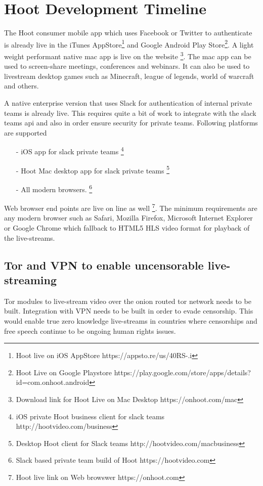 \documentclass{article}
\begin{document}
\section{Hoot Development Timeline}
The Hoot consumer mobile app which uses Facebook or Twitter to authenticate is already live in the iTunes AppStore\footnote{Hoot live on iOS AppStore https://appsto.re/us/40RS-.i} and Google Android Play Store\footnote{Hoot Live on Google Playstore https://play.google.com/store/apps/details?id=com.onhoot.android}.
A light weight performant native  mac app is live on
the website \footnote{Download link for Hoot Live on Mac Desktop https://onhoot.com/mac}. The mac app can be used to screen-share meetings, conferences and webinars. It can also be used
to livestream desktop games such as Minecraft, league of legends,
world of warcraft and others.

A native enterprise version that uses Slack for authentication of
internal private teams is already live.
 This requires quite a bit of work to integrate with the slack teams api and also in order  ensure security for private teams. Following platforms are supported
\begin{itemize}

\item[-]iOS app for slack private teams \footnote{ iOS private Hoot business client for slack teams http://hootvideo.com/business}
\item[-]Hoot Mac desktop app for slack private teams \footnote{Desktop Hoot client for Slack teams http://hootvideo.com/macbusiness}
\item[-]All modern browsers. \footnote{Slack based private team build of Hoot https://hootvideo.com}
\end{itemize}

Web browser end points are live on line as well
\footnote{Hoot live link on Web browswer https://onhoot.com}. The minimum requirements are any modern
browser such as Safari, Mozilla Firefox, Microsoft Internet Explorer
or Google Chrome which fallback to HTML5 HLS video format for playback
of the live-streams.


\subsection{Tor and VPN to enable uncensorable live-streaming }
Tor modules to live-stream video over the onion routed tor network needs
to be built. Integration with VPN needs to be built in order to evade censorship. This would enable true zero knowledge live-streams in
countries where censorships and free speech continue to be ongoing
human rights issues.
\end{document}
